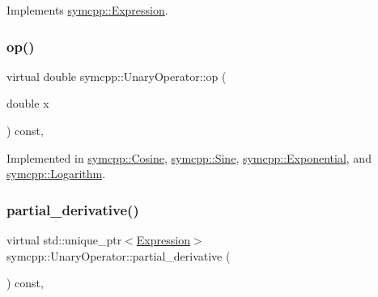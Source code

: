 Implements \mbox{\hyperlink{classsymcpp_1_1Expression_a30db7917c8948e22330cbe8259caeae2}{symcpp\+::\+Expression}}.

\mbox{\label{classsymcpp_1_1UnaryOperator_a679c3c46cad3a62bdd776ff836c7891e}} 
\subsubsection{\texorpdfstring{op()}{op()}}
{\footnotesize\ttfamily virtual double symcpp\+::\+Unary\+Operator\+::op (\begin{DoxyParamCaption}\item[{double}]{x }\end{DoxyParamCaption}) const\hspace{0.3cm}{\ttfamily [private]}, {}}



Implemented in \mbox{\hyperlink{classsymcpp_1_1Cosine_a0b476eebbffe0a2914a02bf6d14b05cd}{symcpp\+::\+Cosine}}, \mbox{\hyperlink{classsymcpp_1_1Sine_afb302fcff7d0a5e528f8fe5a2d111666}{symcpp\+::\+Sine}}, \mbox{\hyperlink{classsymcpp_1_1Exponential_aa36daedb8bf7bfe74f7f5ef85e448a7f}{symcpp\+::\+Exponential}}, and \mbox{\hyperlink{classsymcpp_1_1Logarithm_a349cbd26700ea28d18a42f6f8d7e722c}{symcpp\+::\+Logarithm}}.

\mbox{\label{classsymcpp_1_1UnaryOperator_a85de3214870cd72edc63ac1c221ddeee}} 
\subsubsection{\texorpdfstring{partial\_derivative()}{partial\_derivative()}}
{\footnotesize\ttfamily virtual std\+::unique\+\_\+ptr$<$\mbox{\hyperlink{classsymcpp_1_1Expression}{Expression}}$>$ symcpp\+::\+Unary\+Operator\+::partial\+\_\+derivative (\begin{DoxyParamCaption}{ }\end{DoxyParamCaption}) const\hspace{0.3cm}{\ttfamily [private]}, {}}



